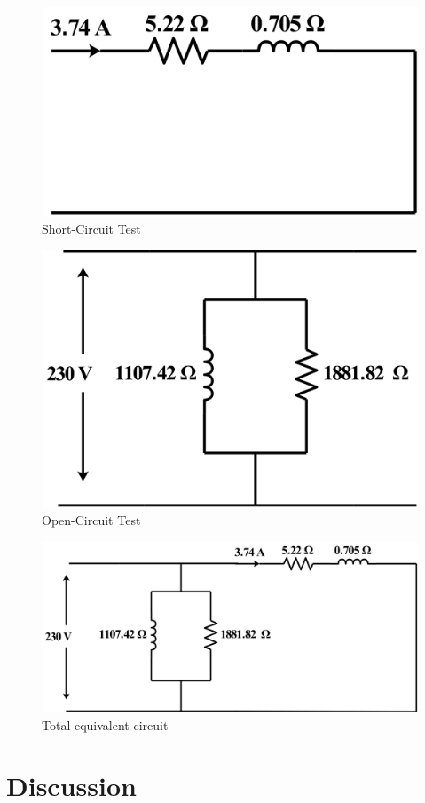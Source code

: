 \documentclass[a4paper,12pt]{article}
\begin{document}
	\begin{figure}[H]
		\centering
		\includegraphics[width=0.55\linewidth]{Images/st}
		\caption{Short-Circuit Test}
		\label{fig:st}
	\end{figure}
		\begin{figure}[H]
		\centering
		\includegraphics[width=0.55\linewidth]{Images/ot}
		\caption{Open-Circuit Test}
		\label{fig:st}
	\end{figure}
		\begin{figure}[H]
		\centering
		\includegraphics[width=0.9\linewidth]{Images/ec}
		\caption{Total equivalent circuit}
		\label{fig:st}
	\end{figure}
	
	\section{Discussion}
	
\end{document}
